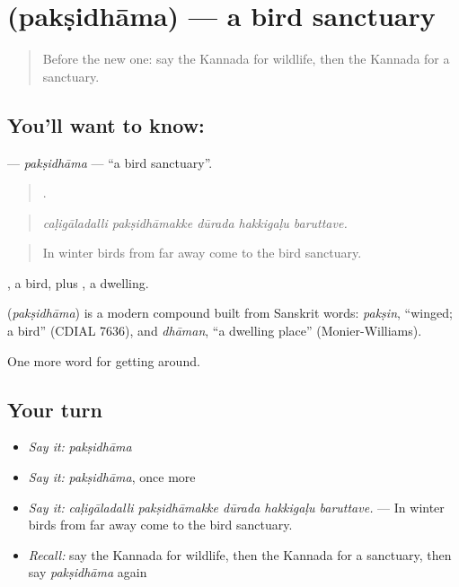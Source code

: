 \section[\texorpdfstring{\kn{ಪಕ್ಷಿಧಾಮ} (pakṣidhāma)}{ಪಕ್ಷಿಧಾಮ (pakṣidhāma)}]{ (pakṣidhāma) — a bird sanctuary}

\label{lesson:KA-C476-paksidhama}



\begin{quote}
Before the new one: say the Kannada for wildlife, then the Kannada for a sanctuary.
\end{quote}

\subsection*{You'll want to know: }
\textbf{} — \emph{pakṣidhāma} — \textquotedblleft{}a bird sanctuary\textquotedblright{}.

\begin{quote}
    .
\end{quote}

\begin{quote}
\emph{caḷigāladalli pakṣidhāmakke dūrada hakkigaḷu baruttave.}
\end{quote}

\begin{quote}
In winter birds from far away come to the bird sanctuary.
\end{quote}

, a bird, plus , a dwelling.

\begin{cousinweb}
\textbf{} (\emph{pakṣidhāma}) is a modern compound built from Sanskrit words: \emph{pakṣin}, \textquotedblleft{}winged; a bird\textquotedblright{} (CDIAL 7636), and \emph{dhāman}, \textquotedblleft{}a dwelling place\textquotedblright{} (Monier-Williams).
\end{cousinweb}

\begin{grammarlens}[title={What you've built}]
One more word for getting around.
\end{grammarlens}

\subsection*{Your turn}
\begin{itemize}
\raggedright
  \item \emph{Say it:} \emph{pakṣidhāma}
  \item \emph{Say it:} \emph{pakṣidhāma}, once more
  \item \emph{Say it:} \emph{caḷigāladalli pakṣidhāmakke dūrada hakkigaḷu baruttave.} — In winter birds from far away come to the bird sanctuary.
  \item \emph{Recall:} say the Kannada for wildlife, then the Kannada for a sanctuary, then say \emph{pakṣidhāma} again
\end{itemize}


